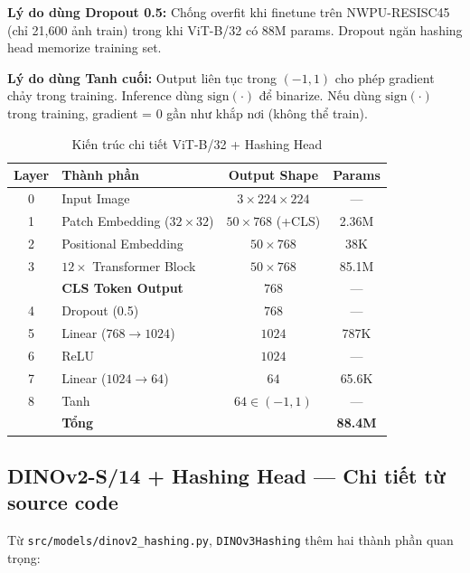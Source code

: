 \documentclass[13pt,a4paper]{article}
\begin{document}
\textbf{Lý do dùng Dropout 0.5:} Chống overfit khi finetune trên NWPU-RESISC45 (chỉ 21{,}600 ảnh train) trong khi ViT-B/32 có 88M params. Dropout ngăn hashing head memorize training set.

\textbf{Lý do dùng Tanh cuối:} Output liên tục trong $(-1,1)$ cho phép gradient chảy trong training. Inference dùng $\text{sign}(\cdot)$ để binarize. Nếu dùng $\text{sign}(\cdot)$ trong training, gradient = 0 gần như khắp nơi (không thể train).

\begin{table}[H]
\centering
\caption{Kiến trúc chi tiết ViT-B/32 + Hashing Head}
\label{tab:vit_arch}
\begin{tabular}{clcc}
\toprule
\textbf{Layer} & \textbf{Thành phần} & \textbf{Output Shape} & \textbf{Params} \\
\midrule
0 & Input Image                & $3 \times 224 \times 224$  & --- \\
1 & Patch Embedding ($32\times32$) & $50 \times 768$ (+CLS)  & 2.36M \\
2 & Positional Embedding       & $50 \times 768$            & 38K \\
3 & $12\times$ Transformer Block & $50 \times 768$          & 85.1M \\
\midrule
  & \textbf{CLS Token Output}  & $768$                      & --- \\
\midrule
4 & Dropout (0.5)              & $768$                      & --- \\
5 & Linear ($768 \to 1024$)    & $1024$                     & 787K \\
6 & ReLU                       & $1024$                     & --- \\
7 & Linear ($1024 \to 64$)     & $64$                       & 65.6K \\
8 & Tanh                       & $64 \in (-1,1)$            & --- \\
\midrule
  & \textbf{Tổng}              &                            & \textbf{88.4M} \\
\bottomrule
\end{tabular}
\end{table}


\subsection{DINOv2-S/14 + Hashing Head --- Chi tiết từ source code}

Từ \texttt{src/models/dinov2\_hashing.py}, \texttt{DINOv3Hashing} thêm hai thành phần quan trọng:
\end{document}

